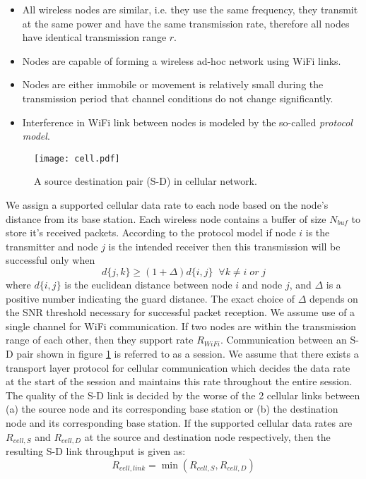 \documentclass{sig-alternate-10pt}
\begin{document}
\begin{itemize}
  \item All wireless nodes are similar, i.e. they use the same frequency, they transmit at the same power and have the same transmission rate, therefore all nodes have identical transmission range $r$.
  \item Nodes are capable of forming a wireless ad-hoc network using WiFi links.
  \item Nodes are either immobile or movement is relatively small  during the transmission period that channel conditions do not change significantly.
  \item Interference in WiFi link between  nodes is modeled by the so-called \emph{protocol model}.\end{itemize}
\begin{figure}[t]
\begin{center}
\texttt{[image: cell.pdf]}
\end{center}
\caption{A source destination pair (S-D)  in cellular network.}
\label{fig:7cell}
\end{figure}
We assign a supported cellular  data rate  to each node based on the node's distance from its base station. Each wireless node contains a buffer of size $N_{buf}$ to store it's received packets. According to the protocol model if node $i$ is the transmitter and node $j$ is the intended receiver then this transmission will be successful only when
\begin{equation*}
d\{j,k\}\geq(1+\Delta)d\{i,j\} \;\; \forall k\neq i \; or \; j\end{equation*}
where $d\{i,j\}$ is the euclidean distance between node $i$ and node $j$, and $\Delta$ is a positive number indicating the guard distance. The exact  choice of $\Delta$ depends on the  SNR  threshold necessary for successful packet reception. 
 We assume use of a single channel for WiFi communication. If two nodes are within the transmission range of each other, then they support rate $R_{WiFi}$. Communication between an S-D pair  shown in figure \ref{fig:7cell} is referred to as a  session. We assume that  there exists a  transport layer protocol for cellular communication which decides the data rate at the start of the session and maintains this rate throughout the entire session. The quality of the S-D link is decided by the worse of the 2 cellular links between (a) the source node and its corresponding base station or (b) the destination node and its corresponding base station. If the supported cellular data rates are $R_{cell,S}$ and  $R_{cell,D}$ at the source and destination node respectively, then the resulting S-D link throughput is given as:
 \begin{equation*}
R_{cell,link}=\min(R_{cell,S},R_{cell,D})
\end{equation*}
\end{document}
